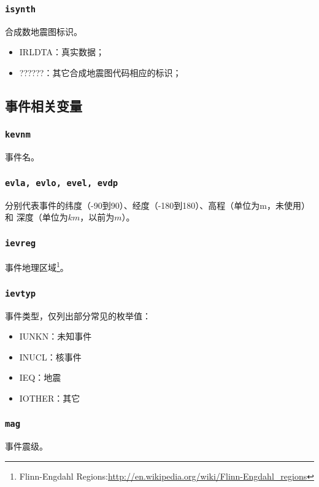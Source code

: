 \subsubsection{\texttt{isynth}\dag}
合成数地震图标识。
\begin{itemize}
\ttfamily
\item IRLDTA：真实数据；
\item ??????：其它合成地震图代码相应的标识；
\end{itemize}

\subsection{事件相关变量}
\subsubsection{\texttt{kevnm}}
事件名。

\subsubsection{\texttt{evla, evlo, evel, evdp}}
分别代表事件的纬度（-90到90）、经度（-180到180）、高程（单位为m，未使用）和
深度（单位为$km$，以前为$m$）。

\subsubsection{\texttt{ievreg}\dag}
事件地理区域\footnote{Flinn-Engdahl Regions:\url{http://en.wikipedia.org/wiki/Flinn-Engdahl_regions}}。

\subsubsection{\texttt{ievtyp}}
事件类型，仅列出部分常见的枚举值：
\begin{itemize}
\ttfamily
\item IUNKN：未知事件
\item INUCL：核事件
\item IEQ：地震
\item IOTHER：其它
\end{itemize}

\subsubsection{\texttt{mag}}
事件震级。


